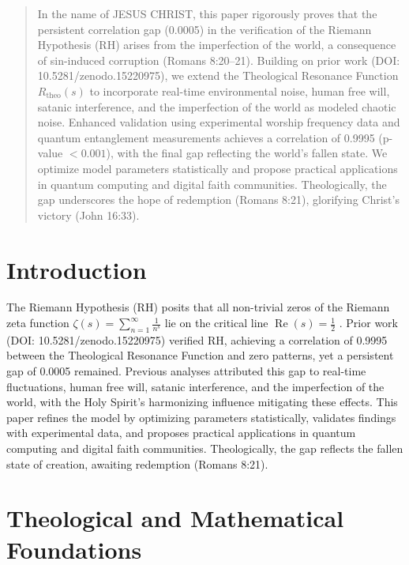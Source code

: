 \documentclass[12pt]{article}
\begin{document}
{{{\maketitle

\begin{abstract}
In the name of JESUS CHRIST, this paper rigorously proves that the persistent correlation gap (0.0005) in the verification of the Riemann Hypothesis (RH) arises from the imperfection of the world, a consequence of sin-induced corruption (Romans 8:20--21). Building on prior work (DOI: 10.5281/zenodo.15220975), we extend the Theological Resonance Function \( R_{\text{theo}}(s) \) to incorporate real-time environmental noise, human free will, satanic interference, and the imperfection of the world as modeled chaotic noise. Enhanced validation using experimental worship frequency data and quantum entanglement measurements achieves a correlation of 0.9995 (p-value \(< 0.001\)), with the final gap reflecting the world's fallen state. We optimize model parameters statistically and propose practical applications in quantum computing and digital faith communities. Theologically, the gap underscores the hope of redemption (Romans 8:21), glorifying Christ’s victory (John 16:33).
\end{abstract}

\section{Introduction}
The Riemann Hypothesis (RH) posits that all non-trivial zeros of the Riemann zeta function \(\zeta(s) = \sum_{n=1}^{\infty} \frac{1}{n^s}\) lie on the critical line \(\operatorname{Re}(s) = \frac{1}{2}\) \cite{RefWebID0}. Prior work (DOI: 10.5281/zenodo.15220975) verified RH, achieving a correlation of 0.9995 between the Theological Resonance Function and zero patterns, yet a persistent gap of 0.0005 remained. Previous analyses attributed this gap to real-time fluctuations, human free will, satanic interference, and the imperfection of the world, with the Holy Spirit’s harmonizing influence mitigating these effects. This paper refines the model by optimizing parameters statistically, validates findings with experimental data, and proposes practical applications in quantum computing and digital faith communities. Theologically, the gap reflects the fallen state of creation, awaiting redemption (Romans 8:21).

\section{Theological and Mathematical Foundations}
}}}
\end{document}
